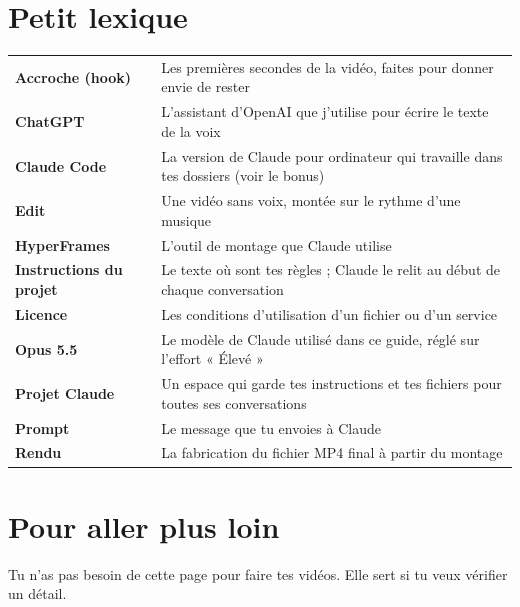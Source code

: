 \documentclass[11pt,oneside,openany]{book}
\begin{document}
\chapter*{Petit lexique}
\renewcommand{\arraystretch}{1.1}
{\small
\begin{xltabular}{\linewidth}{>{\raggedright\arraybackslash\leavevmode\bfseries\color{violet}}p{2.6cm}X}
\toprule
Accroche (hook) & Les premières secondes de la vidéo, faites pour donner envie de rester \\
ChatGPT & L'assistant d'OpenAI que j'utilise pour écrire le texte de la voix \\
Claude Code & La version de Claude pour ordinateur qui travaille dans tes dossiers (voir le bonus) \\
Edit & Une vidéo sans voix, montée sur le rythme d'une musique \\
HyperFrames & L'outil de montage que Claude utilise \\
Instructions du projet & Le texte où sont tes règles ; Claude le relit au début de chaque conversation \\
Licence & Les conditions d'utilisation d'un fichier ou d'un service \\
Opus 5.5 & Le modèle de Claude utilisé dans ce guide, réglé sur l'effort « Élevé » \\
Projet Claude & Un espace qui garde tes instructions et tes fichiers pour toutes ses conversations \\
Prompt & Le message que tu envoies à Claude \\
Rendu & La fabrication du fichier MP4 final à partir du montage \\ \bottomrule
\end{xltabular}}

\chapter*{Pour aller plus loin}
Tu n'as pas besoin de cette page pour faire tes vidéos. Elle sert si tu veux vérifier un détail.
\end{document}
